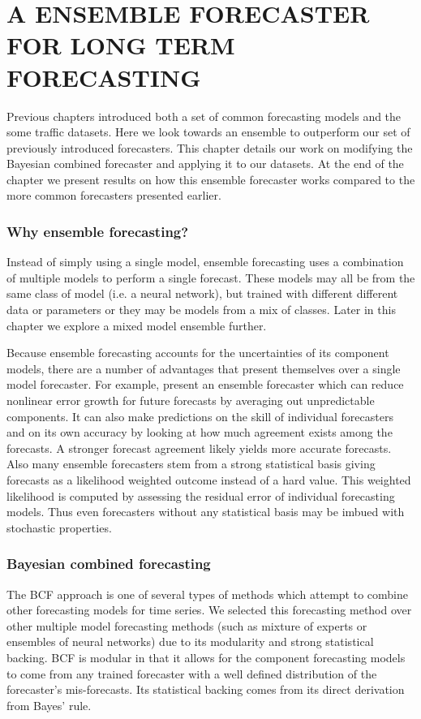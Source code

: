 \chapter{A ENSEMBLE FORECASTER FOR LONG TERM FORECASTING}
\label{ch:BCF}
Previous chapters introduced both a set of common forecasting models and the some traffic datasets.  Here we look towards an ensemble to outperform our set of previously introduced forecasters.  This chapter details our work on modifying the Bayesian combined forecaster and applying it to our datasets.  At the end of the chapter we present results on how this ensemble forecaster works compared to the more common forecasters presented earlier.  

\subsection{Why ensemble forecasting?}
Instead of simply using a single model, ensemble forecasting uses a combination of multiple models to perform a single forecast.  These models may all be from the same class of model (i.e. a neural network), but trained with different different data or parameters or they may be models from a mix of classes.  Later in this chapter we explore a mixed model ensemble further.

Because ensemble forecasting accounts for the uncertainties of its component models, there are a number of advantages that present themselves over a single model forecaster.  For example, \cite{Tracton1993, Zhang2010} present an ensemble forecaster which can reduce nonlinear error growth for future forecasts by averaging out unpredictable components.  It can also make predictions on the skill of individual forecasters and on its own accuracy by looking at how much agreement exists among the forecasts.  A stronger forecast agreement likely yields more accurate forecasts.  Also many ensemble forecasters stem from a strong statistical basis giving forecasts as a likelihood weighted outcome instead of a hard value.  This weighted likelihood is computed by assessing the residual error of individual forecasting models.  Thus even forecasters without any statistical basis may be imbued with stochastic properties.


\subsection{Bayesian combined forecasting}
The BCF approach \cite{Petridis2001} is one of several types of methods which attempt to combine other forecasting models for time series. We selected this forecasting method over other multiple model forecasting methods (such as mixture of experts or ensembles of neural networks) due to its modularity and strong statistical backing.  BCF is modular in that it allows for the component forecasting models to come from any trained forecaster with a well defined distribution of the forecaster's mis-forecasts.  Its statistical backing comes from its direct derivation from Bayes' rule.

